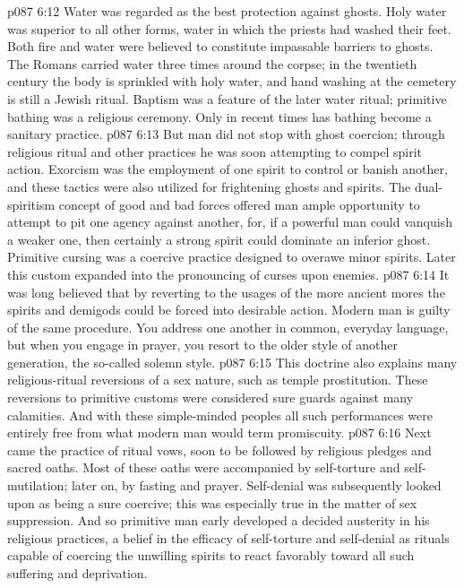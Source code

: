 \vs p087 6:12 Water was regarded as the best protection against ghosts. Holy water was superior to all other forms, water in which the priests had washed their feet. Both fire and water were believed to constitute impassable barriers to ghosts. The Romans carried water three times around the corpse; in the twentieth century the body is sprinkled with holy water, and hand washing at the cemetery is still a Jewish ritual. Baptism was a feature of the later water ritual; primitive bathing was a religious ceremony. Only in recent times has bathing become a sanitary practice.
\vs p087 6:13 But man did not stop with ghost coercion; through religious ritual and other practices he was soon attempting to compel spirit action. Exorcism was the employment of one spirit to control or banish another, and these tactics were also utilized for frightening ghosts and spirits. The dual\hyp{}spiritism concept of good and bad forces offered man ample opportunity to attempt to pit one agency against another, for, if a powerful man could vanquish a weaker one, then certainly a strong spirit could dominate an inferior ghost. Primitive cursing was a coercive practice designed to overawe minor spirits. Later this custom expanded into the pronouncing of curses upon enemies.
\vs p087 6:14 It was long believed that by reverting to the usages of the more ancient mores the spirits and demigods could be forced into desirable action. Modern man is guilty of the same procedure. You address one another in common, everyday language, but when you engage in prayer, you resort to the older style of another generation, the so\hyp{}called solemn style.
\vs p087 6:15 This doctrine also explains many religious\hyp{}ritual reversions of a sex nature, such as temple prostitution. These reversions to primitive customs were considered sure guards against many calamities. And with these simple\hyp{}minded peoples all such performances were entirely free from what modern man would term promiscuity.
\vs p087 6:16 Next came the practice of ritual vows, soon to be followed by religious pledges and sacred oaths. Most of these oaths were accompanied by self\hyp{}torture and self\hyp{}mutilation; later on, by fasting and prayer. Self\hyp{}denial was subsequently looked upon as being a sure coercive; this was especially true in the matter of sex suppression. And so primitive man early developed a decided austerity in his religious practices, a belief in the efficacy of self\hyp{}torture and self\hyp{}denial as rituals capable of coercing the unwilling spirits to react favorably toward all such suffering and deprivation.
